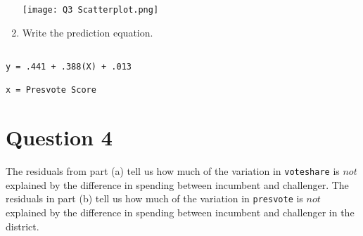\documentclass[12pt,letterpaper]{article}
\begin{document}
\begin{enumerate}
\begin{verbatim}
\end{verbatim}

\texttt{[image: Q3 Scatterplot.png]}

		\item Write the prediction equation.
	\end{enumerate}

\begin{verbatim}

y = .441 + .388(X) + .013

x = Presvote Score

\end{verbatim}
	
\newpage	
\section*{Question 4}
\noindent The residuals from part (a) tell us how much of the variation in \texttt{voteshare} is $not$ explained by the difference in spending between incumbent and challenger. The residuals in part (b) tell us how much of the variation in \texttt{presvote} is $not$ explained by the difference in spending between incumbent and challenger in the district.
\end{document}
